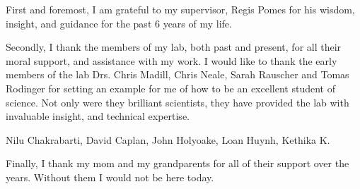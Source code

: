 First and foremost, I am grateful to my supervisor, Regis Pomes for his wisdom, insight, and guidance for the past 6 years of my life.

Secondly, I thank the members of my lab, both past and present, for all their moral support, and assistance with my work. 
I would like to thank the early members of the lab Drs. Chris Madill, Chris Neale, Sarah Rauscher and Tomas Rodinger for setting an example for me of how to be an excellent student of science. Not only were they brilliant scientists, they have provided the lab with invaluable insight, and technical expertise.

Nilu Chakrabarti, David Caplan, John Holyoake, Loan Huynh, Kethika K.




Finally, I thank my mom and my grandparents for all of their support over the years. Without them I would not be here today.

